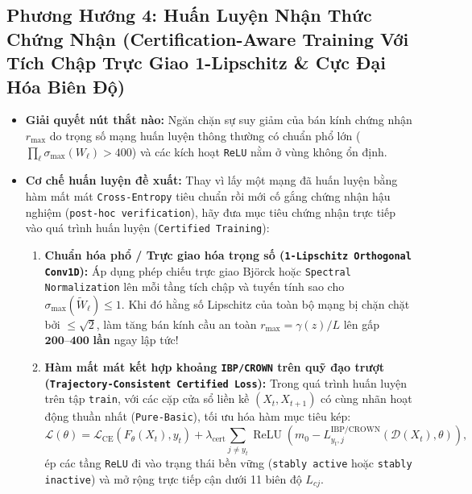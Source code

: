 \documentclass[11pt,a4paper]{article}
\newcommand{\code}[1]{{\small\ttfamily\nolinkurl{#1}}}
\newcommand{\relu}{\operatorname{ReLU}}
\newcommand{\Dset}{\mathcal{D}}
\begin{document}
\subsection{Phương Hướng 4: Huấn Luyện Nhận Thức Chứng Nhận (Certification-Aware Training Với Tích Chập Trực Giao 1-Lipschitz \& Cực Đại Hóa Biên Độ)}
\begin{itemize}
  \item \textbf{Giải quyết nút thắt nào:} Ngăn chặn sự suy giảm của bán kính chứng nhận $r_{\max}$ do trọng số mạng huấn luyện thông thường có chuẩn phổ lớn ($\prod_\ell \sigma_{\max}(W_\ell) > 400$) và các kích hoạt \code{ReLU} nằm ở vùng không ổn định.
  \item \textbf{Cơ chế huấn luyện đề xuất:} Thay vì lấy một mạng đã huấn luyện bằng hàm mất mát \code{Cross-Entropy} tiêu chuẩn rồi mới cố gắng chứng nhận hậu nghiệm (\code{post-hoc verification}), hãy đưa mục tiêu chứng nhận trực tiếp vào quá trình huấn luyện (\code{Certified Training}):
  \begin{enumerate}
    \item \textbf{Chuẩn hóa phổ / Trực giao hóa trọng số (\code{1-Lipschitz Orthogonal Conv1D}):} Áp dụng phép chiếu trực giao Björck hoặc \code{Spectral Normalization} lên mỗi tầng tích chập và tuyến tính sao cho $\sigma_{\max}(\widetilde{W}_\ell) \le 1$. Khi đó hằng số Lipschitz của toàn bộ mạng bị chặn chặt bởi $\le \sqrt{2}$, làm tăng bán kính cầu an toàn $r_{\max} = \gamma(z) / L$ lên gấp $\mathbf{200\text{--}400}$ \textbf{lần} ngay lập tức!
    \item \textbf{Hàm mất mát kết hợp khoảng \code{IBP/CROWN} trên quỹ đạo trượt (\code{Trajectory-Consistent Certified Loss}):} Trong quá trình huấn luyện trên tập \code{train}, với các cặp cửa sổ liền kề $(X_t, X_{t+1})$ có cùng nhãn hoạt động thuần nhất (\code{Pure-Basic}), tối ưu hóa hàm mục tiêu kép:
    \begin{equation}
      \mathcal{L}(\theta) = \mathcal{L}_{\text{CE}}\!\left(F_\theta(X_t), y_t\right) + \lambda_{\text{cert}} \sum_{j \neq y_t} \relu\!\left(m_0 - L_{y_t, j}^{\text{IBP/CROWN}}\!\left(\Dset(X_t), \theta\right)\right),
    \end{equation}
    ép các tầng \code{ReLU} đi vào trạng thái bền vững (\code{stably active} hoặc \code{stably inactive}) và mở rộng trực tiếp cận dưới 11 biên độ $L_{cj}$.
  \end{enumerate}
\end{itemize}
\end{document}

